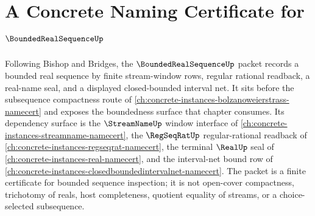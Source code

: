 \chapter{A Concrete Naming Certificate for $\BoundedRealSequenceUp$}
\label{ch:concrete-instances-boundedrealsequence-namecert}

Following Bishop and Bridges, the $\BoundedRealSequenceUp$ packet records a bounded real sequence by finite stream-window rows, regular rational readback, a real-name seal, and a displayed closed-bounded interval net. It sits before the subsequence compactness route of \autoref{ch:concrete-instances-bolzanoweierstrass-namecert} and exposes the boundedness surface that chapter consumes. Its dependency surface is the $\StreamNameUp$ window interface of \autoref{ch:concrete-instances-streamname-namecert}, the $\RegSeqRatUp$ regular-rational readback of \autoref{ch:concrete-instances-regseqrat-namecert}, the terminal $\RealUp$ seal of \autoref{ch:concrete-instances-real-namecert}, and the interval-net bound row of \autoref{ch:concrete-instances-closedboundedintervalnet-namecert}. The packet is a finite certificate for bounded sequence inspection; it is not open-cover compactness, trichotomy of reals, host completeness, quotient equality of streams, or a choice-selected subsequence.

